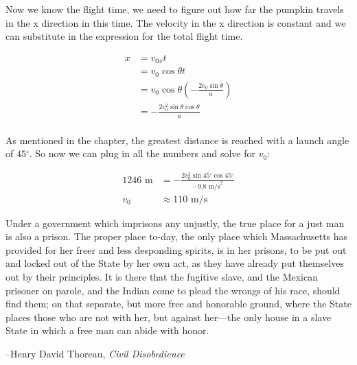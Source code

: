 \documentclass{exam}
\newcommand{\degree}{\ensuremath{^\circ}}
\begin{document}
\begin{questions}
\begin{solution}
Now we know the flight time, we need to figure out how far the pumpkin travels in the x direction in this time.  The
velocity in the x direction is constant and we can substitute in the expression for the total flight time.

\begin{align*}
  x &= v_{0x}t \\
   &= v_0 \cos \theta t \\
   &= v_0 \cos \theta \left( - \frac{2 v_0 \sin \theta}{a} \right) \\
   &= - \frac{2 v_0^2 \sin \theta \cos \theta}{a} \\
\end{align*}

As mentioned in the chapter, the greatest distance is reached with a launch angle of $45 \degree$.  So now we can plug
in all the numbers and solve for $v_0$:

\begin{align*}
   1246 \text{ m} &= - \frac{2 v_0^2 \sin 45 \degree \cos 45 \degree}{-9.8 \text{ m/s}^2} \\
   v_0 &\approx 110 \text{ m/s}
\end{align*}

\end{solution}


\end{questions}

\vspace{5.5 in}

\ifprintanswers
\else
\begin{em}
  Under a government which imprisons any unjustly, the true place for a just man is also a prison. The proper place
  to-day, the only place which Massachusetts has provided for her freer and less desponding spirits, is in her prisons,
  to be put out and locked out of the State by her own act, as they have already put themselves out by their
  principles. It is there that the fugitive slave, and the Mexican prisoner on parole, and the Indian come to plead the
  wrongs of his race, should find them; on that separate, but more free and honorable ground, where the State places
  those who are not with her, but against her---the only house in a slave State in which a free man can abide with honor.
\end{em}

\vspace{.2 cm}
\hspace{1.5 cm} --Henry David Thoreau, {\em Civil Disobedience}

\fi
\end{document}
